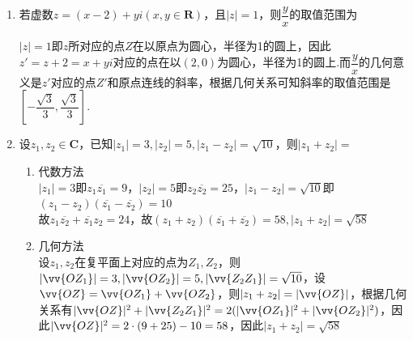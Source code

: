 \begin{enumerate}
\begin{enumerate}
\begin{jieda}
    \end{jieda}
    \item 若虚数$z = (x-2)+yi(x, y \in \mathbf{R})$，且$|z| = 1$，则$\dfrac{y}{x}$的取值范围为
    \begin{jieda}
        $|z| = 1$即$z$所对应的点$Z$在以原点为圆心，半径为1的圆上，因此$z' = z + 2 = x + yi$对应的点在以$(2, 0)$为圆心，半径为1的圆上.而$\dfrac{y}{x}$的几何意义是$z'$对应的点$Z'$和原点连线的斜率，根据几何关系可知斜率的取值范围是$\left[-\dfrac{\sqrt{3}}{3}, \dfrac{\sqrt{3}}{3}\right]$.
    \end{jieda}
    \item 设$z_1, z_2 \in \mathbf{C}$，已知$|z_1| = 3, |z_2| = 5, |z_1 - z_2| = \sqrt{10}$，则$|z_1+z_2| = $
    \begin{jieda}
        \begin{enumerate}
            \item 代数方法 \\
            $|z_1| = 3$即$z_1 \overline{z_1} = 9$，$|z_2| = 5$即$z_2 \overline{z_2} = 25$，$|z_1 - z_2| = \sqrt{10}$即$(z_1 - z_2)(\overline{z_1} - \overline{z_2}) = 10$ \\
            故$z_1\overline{z_2} + \overline{z_1}z_2 = 24$，故$(z_1 + z_2)(\overline{z_1} + \overline{z_2}) = 58, |z_1+z_2| = \sqrt{58}$
            \item 几何方法 \\
            设$z_1, z_2$在复平面上对应的点为$Z_1, Z_2$，则$|\vv{OZ_1}| = 3, |\vv{OZ_2}|=5, |\vv{Z_2Z_1}| = \sqrt{10}$，设$\vv{OZ} = \vv{OZ_1} + \vv{OZ_2}$，则$|z_1 + z_2| = |\vv{OZ}|$，根据几何关系有$|\vv{OZ}|^2 + |\vv{Z_2Z_1}|^2 = 2(|\vv{OZ_1}|^2+|\vv{OZ_2}|^2)$，因此$|\vv{OZ}|^2 = 2\cdot(9+25) - 10 = 58$，因此$|z_1+z_2| = \sqrt{58}$
        \end{enumerate}
        

\end{jieda}
\end{enumerate}
\end{enumerate}
